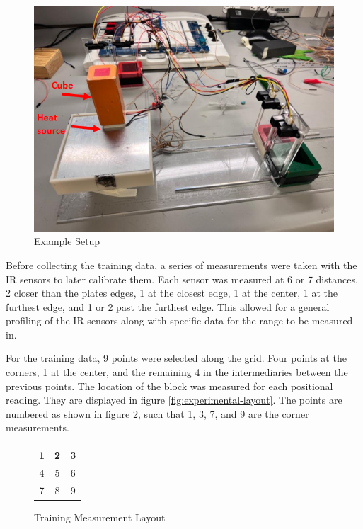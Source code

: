 \documentclass[12pt]{article}
\begin{document}
\begin{figure}[H]
    \centering
    \includegraphics[width=0.75\linewidth]{images/setup.png}
    \caption{Example Setup \cite{lab-manual}}
    \label{fig:setup}
\end{figure}

Before collecting the training data, a series of measurements were taken with the IR sensors to later calibrate them. Each sensor was measured at 6 or 7 distances, 2 closer than the plates edges, 1 at the closest edge, 1 at the center, 1 at the furthest edge, and 1 or 2 past the furthest edge. This allowed for a general profiling of the IR sensors along with specific data for the range to be measured in.

For the training data, 9 points were selected along the grid. Four points at the corners, 1 at the center, and the remaining 4 in the intermediaries between the previous points. The location of the block was measured for each positional reading. They are displayed in figure \ref{fig:experimental-layout}. The points are numbered as shown in figure \ref{fig:layout}, such that 1, 3, 7, and 9 are the corner measurements.

\begin{figure}[H]
    \centering
    \begin{tabular}{c|c|c}
        1 & 2 & 3 \\ \hline
        4 & 5 & 6 \\ \hline
        7 & 8 & 9 \\
    \end{tabular}
    \caption{Training Measurement Layout}
    \label{fig:layout}
\end{figure}
\end{document}
